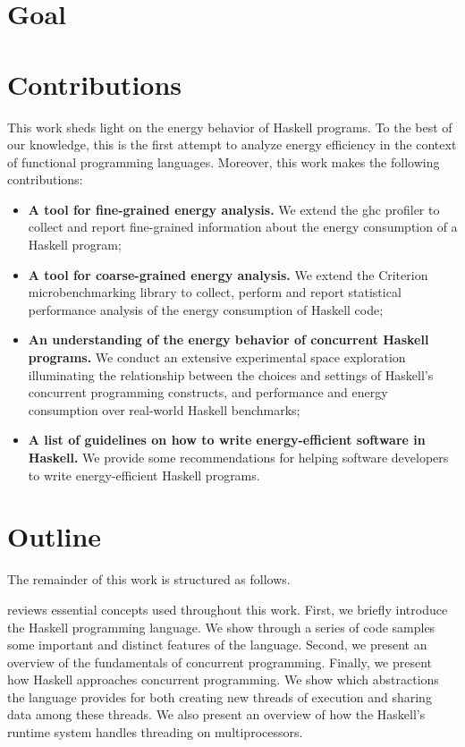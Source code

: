 \section{Goal}
\lipsum[1-1]


\section{Contributions}
This work sheds light on the energy behavior of Haskell programs. To the best of our knowledge, this is the first attempt to analyze energy efficiency in the context of functional programming languages. Moreover, this work makes the following contributions:

\begin{itemize}
  \item \textbf{A tool for fine-grained energy analysis.} We extend the \acs{ghc} profiler to collect and report fine-grained information about the energy consumption of a Haskell program;
  \item \textbf{A tool for coarse-grained energy analysis.} We extend the Criterion microbenchmarking library to collect, perform and report statistical performance analysis of the energy consumption of Haskell code;
  \item \textbf{An understanding of the energy behavior of concurrent Haskell programs.} We conduct an extensive experimental space exploration illuminating the relationship between the choices and settings of Haskell's concurrent programming constructs, and performance and energy consumption over real-world Haskell benchmarks;
  \item \textbf{A list of guidelines on how to write energy-efficient software in Haskell.} We provide some recommendations for helping software developers to write energy-efficient Haskell programs.
\end{itemize}

\section{Outline}
The remainder of this work is structured as follows.

\textbf{} reviews essential concepts used throughout this work. First, we briefly introduce the Haskell programming language. We show through a series of code samples some important and distinct features of the language. Second, we present an overview of the fundamentals of concurrent programming. Finally, we present how Haskell approaches concurrent programming. We show which abstractions the language provides for both creating new threads of execution and sharing data among these threads. We also present an overview of how the Haskell's runtime system handles threading on multiprocessors.


